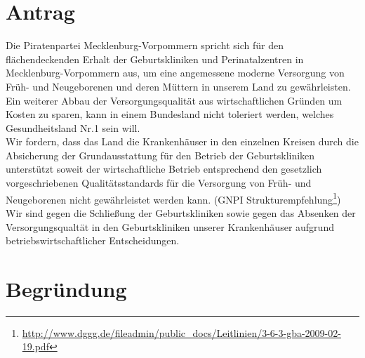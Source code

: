 \section{Antrag}

Die Piratenpartei Mecklenburg-Vorpommern spricht sich für den flächendeckenden Erhalt der Geburtskliniken und Perinatalzentren in Mecklenburg-Vorpommern aus, um eine angemessene moderne Versorgung von Früh- und Neugeborenen und deren Müttern in unserem Land zu gewährleisten. Ein weiterer Abbau der Versorgungsqualität aus wirtschaftlichen Gründen um Kosten zu sparen, kann in einem Bundesland nicht toleriert werden, welches Gesundheitsland Nr.1 sein will.\\Wir fordern, dass das Land die Krankenhäuser in den einzelnen Kreisen durch die Absicherung der Grundausstattung für den Betrieb der Geburtskliniken unterstützt soweit der wirtschaftliche Betrieb entsprechend den gesetzlich vorgeschriebenen Qualitätsstandards für die Versorgung von Früh- und Neugeborenen nicht gewährleistet werden kann. (GNPI Strukturempfehlung\footnote{\url{http://www.dggg.de/fileadmin/public\_docs/Leitlinien/3-6-3-gba-2009-02-19.pdf}})\\Wir sind gegen die Schließung der Geburtskliniken sowie gegen das Absenken der Versorgungsqualtät in den Geburtskliniken unserer Krankenhäuser aufgrund betriebswirtschaftlicher Entscheidungen.

\section{Begründung}

